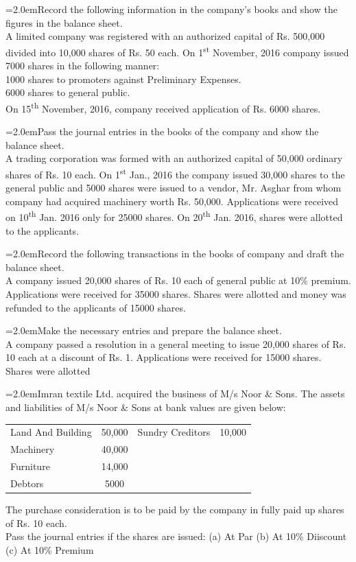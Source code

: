 \documentclass[11pt,a4paper]{article}
\newcommand{\lqn}[2]{\Needspace{6\baselineskip}\par\medskip\noindent\hangindent=2.0em\hangafter=1\makebox[2.0em][l]{\textbf{#1.}}#2\par}
\begin{document}
\lqn{50}{Record the following information in the company’s books and show the figures in the balance sheet.\\
A limited company was registered with an authorized capital of Rs. 500,000 divided into 10,000 shares of Rs. 50 each. On 1\textsuperscript{st}  November, 2016 company issued 7000 shares in the following manner:\\
1000 shares to promoters against Preliminary Expenses.\\
6000 shares to general public.\\
On 15\textsuperscript{th}  November, 2016, company received application of Rs. 6000 shares.\par
}
\lqn{51}{Pass the journal entries in the books of the company and show the balance sheet.\\
A trading corporation was formed with an authorized capital of 50,000 ordinary shares of Rs. 10 each. On 1\textsuperscript{st}  Jan., 2016 the company issued 30,000 shares to the general public and 5000 shares were issued to a vendor, Mr. Asghar from whom company had acquired machinery worth Rs. 50,000. Applications were received on 10\textsuperscript{th}  Jan. 2016 only for 25000 shares. On 20\textsuperscript{th}  Jan. 2016, shares were allotted to the applicants.\par
}
\lqn{52}{Record the following transactions in the books of company and draft the balance sheet.\\
A company issued 20,000 shares of Rs. 10 each of general public at 10\% premium. Applications were received for 35000 shares. Shares were allotted and money was refunded to the applicants of 15000 shares.\par
}
\lqn{53}{Make the necessary entries and prepare the balance sheet.\\
A company passed a resolution in a general meeting to issue 20,000 shares of Rs. 10 each at a discount of Rs. 1. Applications were received for 15000 shares. Shares were allotted\par
}
\lqn{54}{Imran textile Ltd. acquired the business of M/s Noor \& Sons. The assets and liabilities of M/s Noor \& Sons at bank values are given below:\par
\par\smallskip\noindent\hspace*{1.2em}\begin{tabular}{|lccc|}
\hline
Land And Building & 50,000 & Sundry Creditors & 10,000 \\
Machinery & 40,000 &  &  \\
Furniture & 14,000 &  &  \\
Debtors & 5000 &  &  \\
\hline
\end{tabular}\par\smallskip
The purchase consideration is to be paid by the company in fully paid up shares of Rs. 10 each.\\
Pass the journal entries if the shares are issued: (a) At Par            (b) At 10\% Diiscount             \\
 (c) At 10\% Premium\par
}
\end{document}
